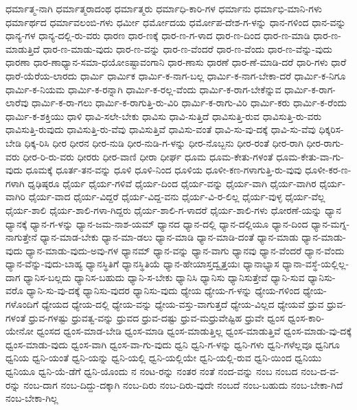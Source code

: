 {ಧರ್ಮಾತ್ಮ-ನಾಗಿ
ಧರ್ಮಾತ್ಮರಾದಂಥ
ಧರ್ಮಾತ್ಮರು
ಧರ್ಮಾಧಿ-ಕಾರಿ-ಗಳ
ಧರ್ಮಾನು
ಧರ್ಮಾಭಿ-ಮಾನಿ-ಗಳು
ಧರ್ಮಾರ್ಥದ
ಧರ್ಮಾವಲಂಬಿ-ಗಳು
ಧರ್ಮೀ
ಧರ್ಮೋದಯ
ಧರ್ಮೋಪ-ದೇಶ-ಗ-ಳನ್ನು
ಧಾನ-ಗಳಿಂದ
ಧಾನ-ವನ್ನು
ಧಾನ್ಯ-ಗಳ
ಧಾನ್ಯ-ದಲ್ಲಿ-ರು-ವರು
ಧಾರಣ
ಧಾರ-ಣಕ್ಕೆ
ಧಾರ-ಣ-ಗ-ಳಾದ
ಧಾರ-ಣ-ದಿಂದ
ಧಾರ-ಣ-ಮಾಡಿ
ಧಾರ-ಣ-ಮಾಡುತ್ತಿದೆ
ಧಾರ-ಣ-ಮಾಡು-ವುದು
ಧಾರ-ಣ-ವನ್ನು
ಧಾರ-ಣ-ವೆಂದರೆ
ಧಾರ-ಣ-ವೆಂದು
ಧಾರ-ಣ-ವೆನ್ನು-ವುದು
ಧಾರಣಾ
ಧಾರ-ಣಾಧ್ಯಾನ-ಸಮಾ-ಧಯೋಽಷ್ಟಾವಂಗಾನಿ
ಧಾರ-ಣಾಸು
ಧಾರಣೆ
ಧಾರ-ಣೆ-ಮಾಡಿ-ದರೆ
ಧಾರಿ-ಗಳು
ಧಾರೆ
ಧಾರೆ-ಯೆರೆಯ-ಲಾರದು
ಧಾರ್ಮಿ
ಧಾರ್ಮಿಕ
ಧಾರ್ಮಿ-ಕ-ನಾಗ-ಬಲ್ಲ
ಧಾರ್ಮಿ-ಕ-ನಾಗ-ಬೇಕಾ-ದರೆ
ಧಾರ್ಮಿ-ಕ-ನಿಗೂ
ಧಾರ್ಮಿ-ಕ-ನಿಯಮ
ಧಾರ್ಮಿ-ಕ-ರನ್ನಾಗಿ
ಧಾರ್ಮಿ-ಕ-ರಲ್ಲ-ವೆಂದು
ಧಾರ್ಮಿ-ಕ-ರಾಗ-ಬೇಕೆನ್ನುವ
ಧಾರ್ಮಿ-ಕ-ರಾಗ-ಲಾರೆವು
ಧಾರ್ಮಿ-ಕ-ರಾ-ಗಲು
ಧಾರ್ಮಿ-ಕ-ರಾಗುತ್ತಿ-ರು-ವಿರಿ
ಧಾರ್ಮಿ-ಕ-ರಾಗು-ವಿರಿ
ಧಾರ್ಮಿ-ಕರು
ಧಾರ್ಮಿ-ಕ-ರೆಂದು
ಧಾರ್ಮಿ-ಕ-ಶಕ್ತಿಯು
ಧಾಳಿ
ಧಾವಿ-ಸಲೇ-ಬೇಕು
ಧಾವಿಸು
ಧಾವಿ-ಸುತ್ತಿದೆ
ಧಾವಿಸುತ್ತಿ-ರುವ
ಧಾವಿಸುತ್ತಿ-ರು-ವರು
ಧಾವಿಸುತ್ತಿ-ರುವುದು
ಧಾವಿಸುತ್ತಿ-ರು-ವೆವು
ಧಾವಿಸುತ್ತಿವೆ
ಧಾವಿಸು-ವಂತೆ
ಧಾವಿ-ಸು-ವು-ದಕ್ಕೆ
ಧಾವಿ-ಸು-ವೆವು
ಧಿಕ್ಕರಿಸ-ಬೇಡಿ
ಧಿಕ್ಕ-ರಿಸಿ
ಧೀರ
ಧೀರನ
ಧೀರ-ನುಡಿ
ಧೀರ-ನುಡಿ-ಗ-ಳನ್ನು
ಧೀರ-ನೊಬ್ಬನು
ಧೀರ-ರಂತೆ
ಧೀರ-ರಾಗಿ
ಧೀರ-ರಾಗು-ವರು
ಧೀರ-ರಿ-ರು-ವರು
ಧೀರರು
ಧೀರ-ವಾಣಿ
ಧೀರಾ
ಧೀರ್ಘ
ಧೂಮ
ಧೂಮ-ಕೇತು-ಗಳಂತೆ
ಧೂಮ-ಕೇತು-ವಾ-ಗು-ವುದು
ಧೂಮಕ್ಕೆ
ಧೂರ್ತ-ತನ-ವನ್ನು
ಧೂಳಿ
ಧೂಳಿ-ನಿಂದ
ಧೂಳಿಯ
ಧೂಳೀ-ಕಣ-ಗಳಾಗುತ್ತಿ-ರು-ವುವು
ಧೂಳೀ-ಕರ-ಣ-ಗಳಾಗಿ
ಧೃಢಿಷ್ಠರೂ
ಧೈರ್ಯ
ಧೈರ್ಯ-ಗಳಿವೆ
ಧೈರ್ಯ-ದಿಂದ
ಧೈರ್ಯ-ವನ್ನು
ಧೈರ್ಯ-ವಾಗಿ
ಧೈರ್ಯ-ವಾಗಿರ
ಧೈರ್ಯ-ವಾಗಿರಿ
ಧೈರ್ಯ-ವಾದ
ಧೈರ್ಯ-ವಿದ್ದರೆ
ಧೈರ್ಯ-ವಿದ್ದ-ವನು
ಧೈರ್ಯ-ವಿ-ರ-ಲಿಲ್ಲ
ಧೈರ್ಯ-ವುಳ್ಳ
ಧೈರ್ಯ-ವೆಲ್ಲ
ಧೈರ್ಯ-ಶಾಲಿ
ಧೈರ್ಯ-ಶಾಲಿ-ಗಳಾ-ಗಿದ್ದರು
ಧೈರ್ಯ-ಶಾಲಿ-ಗ-ಳಾದರೆ
ಧೈರ್ಯ-ಶಾಲಿ-ಗಳು
ಧೋರಣೆ-ಯನ್ನು
ಧ್ಯಾನ
ಧ್ಯಾನಕ್ಕೆ
ಧ್ಯಾನ-ಗ-ಳನ್ನು
ಧ್ಯಾನ-ಜಮ-ನಾಶ-ಯಮ್
ಧ್ಯಾನದ
ಧ್ಯಾನ-ದಲ್ಲಿ
ಧ್ಯಾನ-ದಲ್ಲಿಯೂ
ಧ್ಯಾನ-ದಿಂದ
ಧ್ಯಾನ-ಮಗ್ನ-ನಾಗುತ್ತೇನೆ
ಧ್ಯಾನ-ಮಾಡ-ಬೇಕು
ಧ್ಯಾನ-ಮಾ-ಡಲು
ಧ್ಯಾನ-ಮಾಡಿ
ಧ್ಯಾನ-ಮಾಡಿ-ದಂತೆ
ಧ್ಯಾನ-ಮಾಡು
ಧ್ಯಾನ-ಮಾಡು-ವುದು
ಧ್ಯಾನ-ಮಾಡು-ವುದು-ಅವು-ಗಳ
ಧ್ಯಾನಮ್
ಧ್ಯಾನ-ವನ್ನು
ಧ್ಯಾನ-ವಾಗು
ಧ್ಯಾನವು
ಧ್ಯಾನ-ವೆಂದರೆ
ಧ್ಯಾನ-ವೆಂದು
ಧ್ಯಾನ-ವೆನ್ನು-ವುದು-ಬಾಹ್ಯ
ಧ್ಯಾನಸ್ಥಿತಿಗೆ
ಧ್ಯಾನಸ್ಥಿತಿಯೆ
ಧ್ಯಾನ-ಹೇಯಾಸ್ತದ್ವೃತ್ತಯಃ
ಧ್ಯಾನಾಭ್ಯಾಸ
ಧ್ಯಾನಾ-ವಸ್ಥೆ-ಯಲ್ಲಿಲ್ಲ-ದಾಗ
ಧ್ಯಾನಿಸ-ಬಲ್ಲದು
ಧ್ಯಾನಿಸ-ಬಹುದು
ಧ್ಯಾನಿ-ಸ-ಬೇಕು
ಧ್ಯಾನಿಸಿ
ಧ್ಯಾನಿಸು
ಧ್ಯಾನಿಸುತ್ತೇವೆ
ಧ್ಯಾನಿ-ಸುವ
ಧ್ಯಾನಿಸು-ವರೊ
ಧ್ಯಾನಿ-ಸು-ವು-ದಕ್ಕೆ
ಧ್ಯಾನಿಸು-ವುದರ
ಧ್ಯಾನಿಸು-ವುದು
ಧ್ಯೇಯ
ಧ್ಯೇಯ-ಗ-ಳನ್ನು
ಧ್ಯೇಯ-ಗಳಿಂದ
ಧ್ಯೇಯ-ಗಳೊಂದಿಗೆ
ಧ್ಯೇಯದ
ಧ್ಯೇಯ-ದಲ್ಲಿ
ಧ್ಯೇಯ-ವನ್ನು
ಧ್ಯೇಯ-ವಸ್ತು-ವಾಗುತ್ತದೆ
ಧ್ಯೇಯ-ವಿಲ್ಲದ
ಧ್ಯೇಯವೆ
ಧ್ರುವ
ಧ್ರುವ-ಗಳಂತೆ
ಧ್ರುವ-ಗಳಷ್ಟು
ಧ್ರುವತ್ವ-ವನ್ನು
ಧ್ರುವದ
ಧ್ರುವ-ದಷ್ಟು
ಧ್ರುವ-ಮಧ್ರುವೇಷ್ಟಿಹ
ಧ್ರುವೇ
ಧ್ವಂಸ
ಧ್ವಂಸ-ಕಾರಿ-ಯೇನೋ
ಧ್ವಂಸದ
ಧ್ವಂಸ-ಮಾಡ-ಬೇಡಿ
ಧ್ವಂಸ-ಮಾಡಿ
ಧ್ವಂಸ-ಮಾಡುತ್ತಿಲ್ಲ
ಧ್ವಂಸ-ಮಾಡುತ್ತಿವೆ
ಧ್ವಂಸ-ಮಾಡು-ವು-ದಕ್ಕೆ
ಧ್ವಂಸ-ಮಾಡು-ವುದು
ಧ್ವಂಸ-ವಾಗಿ
ಧ್ವಂಸ-ವಾ-ಗು-ವುದು
ಧ್ವನಿ
ಧ್ವನಿ-ಗ-ಳನ್ನು
ಧ್ವನಿ-ಗಳು
ಧ್ವನಿ-ಗಳೆಲ್ಲವೂ
ಧ್ವನಿಗೂ
ಧ್ವನಿಯ
ಧ್ವನಿ-ಯಂತೆ
ಧ್ವನಿ-ಯನ್ನು
ಧ್ವನಿ-ಯಲ್ಲಿ
ಧ್ವನಿ-ಯಲ್ಲಿಯೇ
ಧ್ವನಿ-ಯಲ್ಲಿ-ರುವ
ಧ್ವನಿ-ಯಿಂದ
ಧ್ವನಿಯು
ಧ್ವನಿಯೂ
ಧ್ವನಿ-ಯೆ-ಡೆಗೆ
ಧ್ವನಿ-ಯೊಂದು
ನ
ನಂಟ-ರನ್ನು
ನಂತರ
ನಂತೆ
ನಂದ-ವನ್ನು
ನಂಬ
ನಂಬದ
ನಂಬ-ದ-ವ-ರನ್ನು
ನಂಬ-ದಾಗ
ನಂಬ-ದಿದ್ದು-ದಕ್ಕಾಗಿ
ನಂಬ-ದಿರು
ನಂಬ-ದಿರು-ವುದೇ
ನಂಬದೆ
ನಂಬ-ಬಹುದು
ನಂಬ-ಬೇಕಾ-ಗಿದೆ
ನಂಬ-ಬೇಕಾ-ಗಿಲ್ಲ
}
